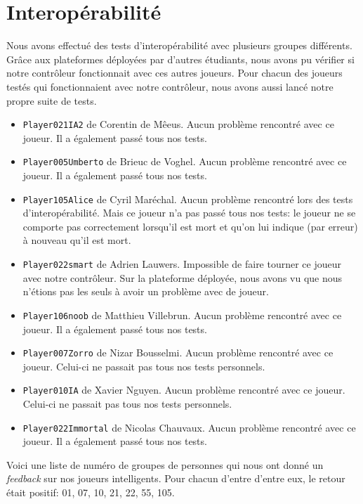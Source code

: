 \documentclass{article}
\begin{document}
\section{Interopérabilité}
Nous avons effectué des tests d'interopérabilité avec plusieurs groupes différents. Grâce aux plateformes déployées par d'autres étudiants, nous avons pu vérifier si notre contrôleur fonctionnait avec ces autres joueurs. Pour chacun des joueurs testés qui fonctionnaient avec notre contrôleur, nous avons aussi lancé notre propre suite de tests.
\begin{itemize}
	\item \texttt{Player021IA2} de Corentin de Mêeus. Aucun problème rencontré avec ce joueur. Il a également passé tous nos tests.
	\item \texttt{Player005Umberto} de Brieuc de Voghel. Aucun problème rencontré avec ce joueur. Il a également passé tous nos tests.
	\item \texttt{Player105Alice} de Cyril Maréchal. Aucun problème rencontré lors des tests d'interopérabilité. Mais ce joueur n'a pas passé tous nos tests: le joueur ne se comporte pas correctement lorsqu'il est mort et qu'on lui indique (par erreur) à nouveau qu'il est mort.
	\item \texttt{Player022smart} de Adrien Lauwers. Impossible de faire tourner ce joueur avec notre contrôleur. Sur la plateforme déployée, nous avons vu que nous n'étions pas les seuls à avoir un problème avec de joueur.
	\item \texttt{Player106noob} de Matthieu Villebrun. Aucun problème rencontré avec ce joueur. Il a également passé tous nos tests.
	\item \texttt{Player007Zorro} de Nizar Bousselmi. Aucun problème rencontré avec ce joueur. Celui-ci ne passait pas tous nos tests personnels.
	\item \texttt{Player010IA} de Xavier Nguyen. Aucun problème rencontré avec ce joueur. Celui-ci ne passait pas tous nos tests personnels.
	\item \texttt{Player022Immortal} de Nicolas Chauvaux. Aucun problème rencontré avec ce joueur. Il a également passé tous nos tests.
\end{itemize}
Voici une liste de numéro de groupes de personnes qui nous ont donné un \emph{feedback} sur nos joueurs intelligents. Pour chacun d'entre d'entre eux, le retour était positif: 01, 07, 10, 21, 22, 55, 105.
\end{document}
